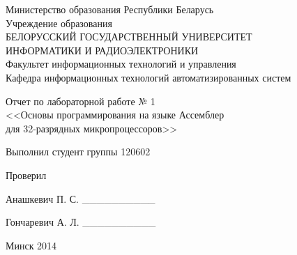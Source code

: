 \thispagestyle{empty}
\setlength{\parindent}{0ex} %

\begin{center}
  Министерство образования Республики Беларусь \\
  \vspace{0.5ex}
  Учреждение образования \\
  БЕЛОРУССКИЙ ГОСУДАРСТВЕННЫЙ УНИВЕРСИТЕТ \\
  ИНФОРМАТИКИ И РАДИОЭЛЕКТРОНИКИ \\
  \vspace{0.5ex}
  Факультет информационных технологий и управления \\
  \vspace{0.5ex}
  Кафедра информационных технологий автоматизированных систем
\end{center}

\vspace{50mm}

\begin{center}
  Отчет по лабораторной работе № 1 \\
  <<Основы программирования на языке Ассемблер \\
  для 32-разрядных микропроцессоров>>
\end{center}

\vspace{40mm}

\begin{minipage}{.55\linewidth}
    Выполнил студент группы 120602

    \smallskip

    Проверил
\end{minipage}
\hfill
\begin{minipage}{.4\linewidth}
  \begin{flushright}
    Анашкевич П. С. \_\_\_\_\_\_\_\_\_\_

    \smallskip

    Гончаревич А. Л. \_\_\_\_\_\_\_\_\_\_
  \end{flushright}
\end{minipage}

\vspace{60mm}
\begin{center}
  Минск 2014
\end{center}

\setlength{\parindent}{1.25cm} %

\newpage
